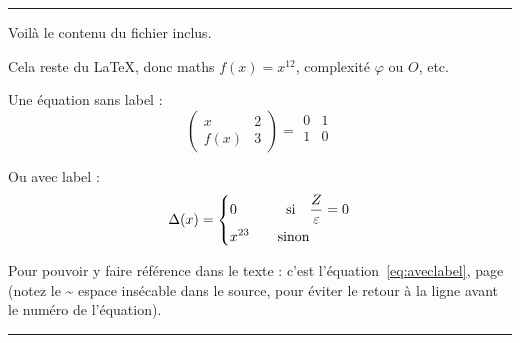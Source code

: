 \vspace{1ex}

\hrule
Voilà le contenu du fichier inclus.

Cela reste du \LaTeX, donc maths $f(x)=x^12$, complexité $\varphi$ ou $O$, etc.

Une équation sans label :
$$
\begin{pmatrix}
	x&2\\
	f(x)&3
\end{pmatrix}
=\begin{matrix}
0&1\\
1&0\\
\end{matrix}
$$

Ou avec label : 
\begin{equation}
	\label{eq:aveclabel}
	\Delta(x) = \left\{
	\begin{aligned}
		&0 & \text{si\quad} &\frac{Z}{\varepsilon}=0\\
		&x^{23} & \text{\quad sinon}&\\
	\end{aligned}
	\right.
\end{equation}

Pour pouvoir y faire référence dans le texte : c'est l'équation~\ref{eq:aveclabel}, page~\pageref{eq:aveclabel} (notez le \~{}  espace insécable dans le source, pour éviter le retour à la ligne avant le numéro de l'équation).
\hrule
\vspace{1ex}
